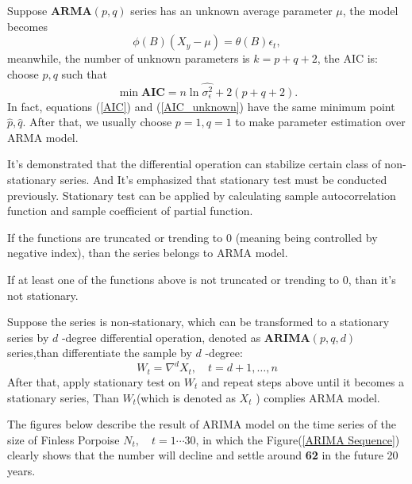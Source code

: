 \documentclass{mcmthesis}
\numberwithin{figure}{section}
\numberwithin{table}{section}
\numberwithin{equation}{section}
\begin{document}
\par
Suppose $ \mathbf{ARMA}(p,q) $ series has an unknown average parameter $ \mu $,
the model becomes
$$
  \phi(B)(X_y-\mu) = \theta(B)\epsilon_t,
$$   
meanwhile, the number of unknown parameters is $ k = p+q+2 $, the AIC is:
choose $ p,q $ such that
\begin{equation}\label{AIC_unknown}
  \min \mathbf{AIC} = n\ln\hat{\sigma_\epsilon^2}+2(p+q+2).
\end{equation}  
In fact, equations (\ref{AIC}) and (\ref{AIC_unknown}) have the same minimum point $ \hat{p},\hat{q} $.
After that, we usually choose $ p = 1, q = 1 $ to make parameter estimation 
over ARMA model.
\par
It's demonstrated that the differential operation can stabilize 
certain class of non-stationary series. And It's emphasized that 
stationary test must be conducted previously. Stationary test can 
be applied by calculating sample autocorrelation function and 
sample coefficient of partial function. 
\par
If the functions are truncated or trending to 0 (meaning being controlled
by negative index), than the series belongs to ARMA model.
\par
If at least one of the functions above is not truncated or trending to 0, than
it's not stationary.
\par
Suppose the series is non-stationary, which can be transformed to 
a stationary series by $ d $ -degree differential operation, denoted
as $ \mathbf{ARIMA}(p,q,d) $ series,than differentiate the sample by
$ d $ -degree:
$$
  W_t = \nabla^dX_t,\quad t = d+1,\dots , n
$$ 
After that, apply stationary test on $ W_t $ and repeat steps above 
until it becomes a stationary series, Than $ W_t $(which is denoted
as $ X_t $ ) complies ARMA model. 
\par
The figures below describe the result of ARIMA model on the 
time series of the size of Finless Porpoise $ N_t, \quad t = 1\cdots 30 $,
in which the Figure(\ref{ARIMA Sequence}) clearly shows that the number
will decline and settle around \textbf{62} in the future 20 years. 
\end{document}
